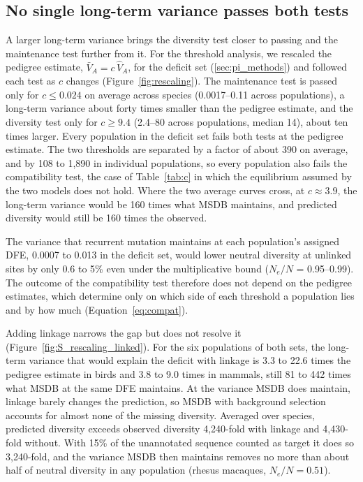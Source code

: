 \documentclass{article}
\begin{document}
\subsection{No single long-term variance passes both tests}\label{sec:res_rescaling}
A larger long-term variance brings the diversity test closer to passing and the maintenance test further from it. For the threshold analysis, we rescaled the pedigree estimate, $\bar{V}_A = c\,\hat{V}_A$, for the deficit set (\autoref{sec:pi_methods}) and followed each test as $c$ changes (Figure~\ref{fig:rescaling}). The maintenance test is passed only for $c \le 0.024$ on average across species (0.0017--0.11 across populations), a long-term variance about forty times smaller than the pedigree estimate, and the diversity test only for $c \ge 9.4$ (2.4--80 across populations, median 14), about ten times larger. Every population in the deficit set fails both tests at the pedigree estimate. The two thresholds are separated by a factor of about 390 on average, and by 108 to 1,890 in individual populations, so every population also fails the compatibility test, the case of Table~\ref{tab:c} in which the equilibrium assumed by the two models does not hold. Where the two average curves cross, at $c \approx 3.9$, the long-term variance would be 160 times what MSDB maintains, and predicted diversity would still be 160 times the observed.

The variance that recurrent mutation maintains at each population's assigned DFE, 0.0007 to 0.013 in the deficit set, would lower neutral diversity at unlinked sites by only 0.6 to 5\% even under the multiplicative bound ($N_e/N$ = 0.95--0.99). The outcome of the compatibility test therefore does not depend on the pedigree estimates, which determine only on which side of each threshold a population lies and by how much (Equation~\eqref{eq:compat}).

Adding linkage narrows the gap but does not resolve it (Figure~\ref{fig:S_rescaling_linked}). For the six populations of both sets, the long-term variance that would explain the deficit with linkage is 3.3 to 22.6 times the pedigree estimate in birds and 3.8 to 9.0 times in mammals, still 81 to 442 times what MSDB at the same DFE maintains. At the variance MSDB does maintain, linkage barely changes the prediction, so MSDB with background selection accounts for almost none of the missing diversity. Averaged over species, predicted diversity exceeds observed diversity 4,240-fold with linkage and 4,430-fold without. With 15\% of the unannotated sequence counted as target it does so 3,240-fold, and the variance MSDB then maintains removes no more than about half of neutral diversity in any population (rhesus macaques, $N_e/N = 0.51$).
\end{document}
